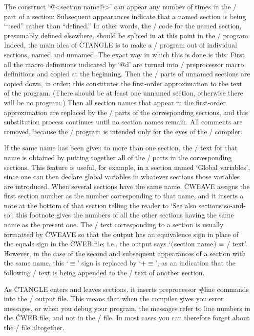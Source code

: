 The construct `\.{@<section name@>}' can appear
any number of times in the \CEE/ part of a section:
Subsequent appearances indicate that a named section is being
``used'' rather than ``defined.'' In other words, the
\CEE/ code for the named section, presumably defined elsewhere, should be
spliced in at this point in the \CEE/ program.  Indeed,
the main idea of \.{CTANGLE} is to make a \CEE/ program out of
individual sections, named and unnamed.  The exact way in which this is done
is this: First all the macro definitions
indicated by `\.{@d}' are turned into \CEE/ preprocessor macro definitions
and copied at the beginning.
Then the \CEE/ parts of unnamed sections are copied down,
in order; this constitutes the first-order
approximation to the text of the program. (There should be at least
one unnamed section, otherwise there will be no program.) Then all section
names that appear in the first-order approximation are replaced by the \CEE/
parts of the corresponding sections, and this substitution process
continues until no section names remain. All comments are removed, because
the \CEE/ program is intended only for the eyes of the \CEE/ compiler.

If the same name has been given to more than one section, the \CEE/ text
for that name is obtained by putting together all of the \CEE/ parts in
the corresponding sections. This feature is useful, for example, in a
section named `Global variables', since one can then
declare global variables in whatever sections those variables are
introduced. When several sections have the same name, \.{CWEAVE} assigns the
first section number as the number corresponding to that name, and it
inserts a note at the bottom of that section telling the reader to `See
also sections so-and-so'; this footnote gives the numbers of all the other
sections having the same name as the present one. The \CEE/ text
corresponding to a section is usually formatted by \.{CWEAVE} so that the
output has an equivalence sign in place of the equals sign in the \.{CWEB}
file; i.e., the output says `$\langle\,$section
name$\,\rangle\equiv\null$\CEE/ text'. However, in the case of the second
and subsequent appearances of a section with the same name, this `$\equiv$'
sign is replaced by `$\mathrel+\equiv$', as an indication that the
following \CEE/ text is being appended to the \CEE/ text of another section.

As \.{CTANGLE} enters and leaves sections, it inserts preprocessor
\.{\#line} commands into the \CEE/ output file.  This means that
when the compiler gives you error messages, or when you debug your program,
the messages refer to line numbers in the \.{CWEB} file, and not in the
\CEE/ file.  In most cases you can therefore
forget about the \CEE/ file altogether.


